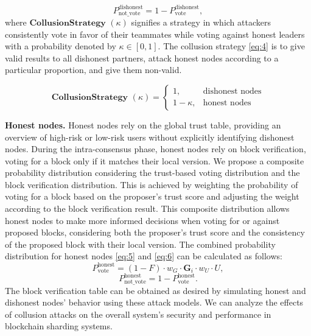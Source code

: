 \begin{equation}
    P_\text{not\_vote}^{\text{dishonest}} = 1 - P_\text{vote}^{\text{dishonest}},
    \label{eq:3}
\end{equation}
where $\textbf{CollusionStrategy }(\kappa)$ signifies a strategy in which attackers consistently vote in favor of their teammates while voting against honest leaders with a probability denoted by $\kappa \in [0,1]$. The collusion strategy \eqref{eq:4} is to give valid results to all dishonest partners, attack honest nodes according to a particular proportion, and give them non-valid.


\begin{equation}
     \textbf{CollusionStrategy }(\kappa)= 
    \begin{cases}
        1, & \text{dishonest nodes} \\
        1-\kappa, & \text{honest nodes}
    \end{cases}
    \label{eq:4}
\end{equation}



\smallskip
\noindent\textbf{Honest nodes.}
Honest nodes rely on the global trust table, providing an overview of high-risk or low-risk users without explicitly identifying dishonest nodes. During the intra-consensus phase, honest nodes rely on block verification, voting for a block only if it matches their local version. We propose a composite probability distribution considering the trust-based voting distribution and the block verification distribution. This is achieved by weighting the probability of voting for a block based on the proposer's trust score and adjusting the weight according to the block verification result. This composite distribution allows honest nodes to make more informed decisions when voting for or against proposed blocks, considering both the proposer's trust score and the consistency of the proposed block with their local version. The combined probability distribution for honest nodes \eqref{eq:5} and \eqref{eq:6} can be calculated as follows:
\begin{equation}
    P_\text{vote}^{\text{honest}} = (1-F) \cdot w_G \cdot \mathbf{G}_i \cdot  w_U \cdot U,
    \label{eq:5}
\end{equation}
\begin{equation}
    P_\text{not\_vote}^{\text{honest}} = 1 - P_\text{vote}^{\text{honest}}.
    \label{eq:6}
\end{equation}
The block verification table can be obtained as desired by simulating honest and dishonest nodes' behavior using these attack models. We can analyze the effects of collusion attacks on the overall system's security and performance in blockchain sharding systems.


